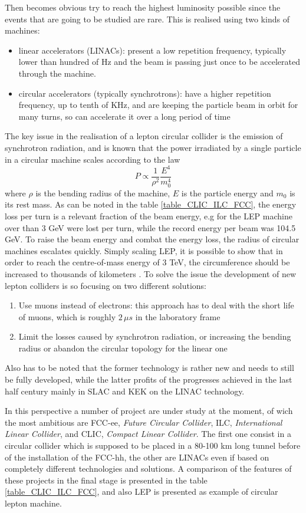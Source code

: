 Then becomes obvious try to reach the highest luminosity possible since the events that are going to be studied are rare. This is realised using two kinds of machines:
\begin{itemize}
\item linear accelerators (LINACs): present a low repetition frequency, typically lower than hundred of Hz and the beam is passing just once to be accelerated through the machine.
\item circular accelerators (typically synchrotrons): have a higher repetition frequency, up to tenth of KHz, and are keeping the particle beam in orbit for many turns, so can accelerate it over a long period of time
\end{itemize}
The key issue in the realisation of a lepton circular collider is the emission of synchrotron radiation, and is known that the power irradiated by a single particle in a circular machine scales according to the law
\[
P \propto \frac{1}{\rho^2} \frac{E^4}{m_0^4}
\]
where $\rho$ is the bending radius of the machine, $E$ is the particle energy and $m_0$ is its rest mass. As can be noted in the table \ref{table_CLIC_ILC_FCC}, the energy loss per turn is a relevant fraction of the beam energy, e.g for the LEP machine over than 3 GeV were lost per turn, while the record energy per beam was 104.5 GeV. To raise the beam energy and combat the energy loss, the radius of circular machines escalates quickly. Simply scaling LEP, it is possible to show that in order to reach the centre-of-mass energy of 3 TeV, the circumference should be increased to thousands of kilometers \cite{nature:CLIC}.
To solve the issue the development of new lepton colliders is so focusing on two different solutions:
\begin{enumerate}
\item Use muons instead of electrons: this approach has to deal with the short life of muons, which is roughly $2 \, \mu s$ in the laboratory frame
\item Limit the losses caused by synchrotron radiation, or increasing the bending radius or abandon the circular topology for the linear one
\end{enumerate}
Also has to be noted that the former technology is rather new and needs to still be fully developed, while the latter profits of the progresses achieved in the last half century mainly in SLAC and KEK on the LINAC technology.

In this perspective a number of project are under study at the moment, of wich the most ambitious are FCC-ee, \textit{Future Circular Collider}, ILC, \textit{International Linear Collider}, and CLIC, \textit{Compact Linear Collider}. The first one consist in a circular collider which is supposed to be placed in a 80-100 km long tunnel before of the installation of the FCC-hh, the other are LINACs even if based on completely different technologies and solutions.  A comparison of the features of these projects in the final stage is presented in the table \ref{table_CLIC_ILC_FCC}, and also LEP is presented as example of circular lepton machine.

